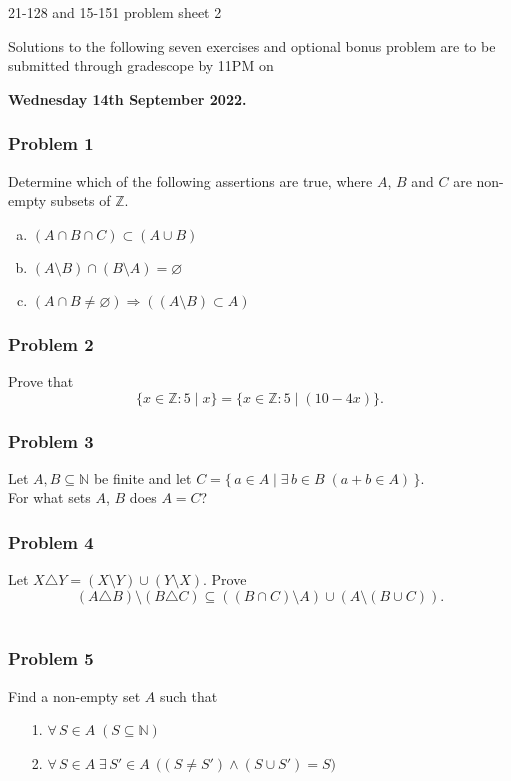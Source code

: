 \documentclass[11pt,onecolumn,fleqn]{article}
\theoremstyle{definition}
\def\fall#1{\forall\, {#1}\;}
\def\fex#1{\exists \,{#1}\;}
\def\set#1#2{\{\, {#1} \mid {#2}\,\}}
\begin{document}
\thispagestyle{empty}
\begin{center}
{\Huge
21-128 and 15-151 problem sheet 2
}

Solutions to the following seven exercises and optional bonus problem are to be submitted through 
gradescope by 11PM on

\textbf{Wednesday 14th September 2022.}

\end{center}


\subsubsection*{Problem 1}
Determine which of the following assertions are true, where $A$, $B$ and $C$ are non-empty subsets of $\mathbb{Z}$.
\begin{enumerate}[(a)]
  \item $(A\cap B\cap C) \subset (A\cup B)$
  \item $(A\setminus B) \cap (B\setminus A) = \varnothing $
  \item $(A \cap B\neq \varnothing)\Longrightarrow ((A \setminus B)\subset A)$
\end{enumerate}

\subsubsection*{Problem 2}
Prove that
$$\{ x \in \mathbb{Z} : 5 \mid x \} = \{ x \in \mathbb{Z} : 5 \mid (10 - 4x) \}.$$

\subsubsection*{Problem 3}
Let $A, B \subseteq \mathbb{N}$ be finite and let 
$C = \set{a \in A}{ \fex{b \in B} ( a + b \in A )}$.\\ For what sets $A$, $B$ does $A = C$?

\subsubsection*{Problem 4}
Let $X \triangle Y = (X \setminus Y) \cup (Y \setminus X)$. Prove $$(A \triangle B) \setminus (B \triangle C) \subseteq ((B \cap C) \setminus A) \cup (A \setminus (B \cup C)). $$\\

\subsubsection*{Problem 5}
Find a non-empty set $A$ such that 
\begin{enumerate}
\item[1.] $\fall{S \in A} ( S \subseteq \mathbb{N} )$
\item[2.] $\fall{S \in A} \fex{S' \in A}\,\bigl(( S \neq S') \wedge (S \cup S') = S \bigr)$
\end{enumerate}
\end{document}

